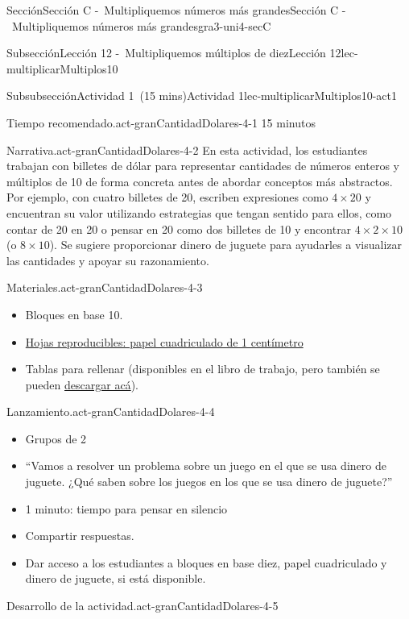 \documentclass[oneside,10pt,]{article}
\begin{document}
\begin{sectionptx}{Sección}{Sección C -~Multipliquemos números más grandes}{}{Sección C -~Multipliquemos números más grandes}{}{}{gra3-uni4-secC}
\begin{subsectionptx}{Subsección}{Lección 12 -~Multipliquemos múltiplos de diez}{}{Lección 12}{}{}{lec-multiplicarMultiplos10}
\begin{subsubsectionptx}{Subsubsección}{Actividad 1~(15 mins)}{}{Actividad 1}{}{}{lec-multiplicarMultiplos10-act1}
\begin{paragraphs}{Tiempo recomendado.}{act-granCantidadDolares-4-1}%
15 minutos%
\end{paragraphs}%
\begin{paragraphs}{Narrativa.}{act-granCantidadDolares-4-2}%
En esta actividad, los estudiantes trabajan con billetes de dólar para representar cantidades de números enteros y múltiplos de 10 de forma concreta antes de abordar conceptos más abstractos. Por ejemplo, con cuatro billetes de \textdollar{}20, escriben expresiones como \(4 \times 20\) y encuentran su valor utilizando estrategias que tengan sentido para ellos, como contar de 20 en 20 o pensar en \textdollar{}20 como dos billetes de \textdollar{}10 y encontrar \(4 \times 2 \times 10\) (o \(8 \times 10\)). Se sugiere proporcionar dinero de juguete para ayudarles a visualizar las cantidades y apoyar su razonamiento.%
\end{paragraphs}%
\begin{paragraphs}{Materiales.}{act-granCantidadDolares-4-3}%
%
\begin{itemize}[label=\textbullet]
\item{}Bloques en base 10.%
\item{}\hyperref[blm-papelCuadriculadoCentimetro]{Hojas reproducibles: papel cuadriculado de 1 centímetro}%
\item{}Tablas para rellenar (disponibles en el libro de trabajo, pero también se pueden \href{external/act-pdf/act-granCantidadDolares.pdf}{descargar acá}\footnotemark{}).%
\end{itemize}
\end{paragraphs}%
\begin{paragraphs}{Lanzamiento.}{act-granCantidadDolares-4-4}%
%
\begin{itemize}[label=\textbullet]
\item{}Grupos de 2%
\item{}``Vamos a resolver un problema sobre un juego en el que se usa dinero de juguete. ¿Qué saben sobre los juegos en los que se usa dinero de juguete?''%
\item{}1 minuto: tiempo para pensar en silencio%
\item{}Compartir respuestas.%
\item{}Dar acceso a los estudiantes a bloques en base diez, papel cuadriculado y dinero de juguete, si está disponible.%
\end{itemize}
\end{paragraphs}%
\begin{paragraphs}{Desarrollo de la actividad.}{act-granCantidadDolares-4-5}%

\end{paragraphs}
\end{subsubsectionptx}
\end{subsectionptx}
\end{sectionptx}
\end{document}
